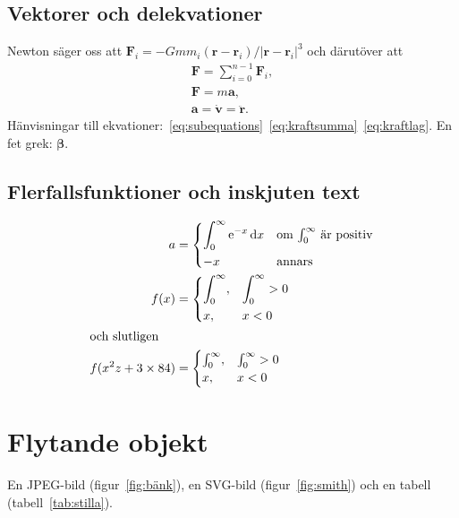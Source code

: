 \documentclass[a4paper, article, oneside, leqno]{memoir}
\begin{document}
\section{Vektorer och delekvationer}
Newton säger oss att \(\mathbf{F}_i = -Gmm_i(\mathbf{r}-\mathbf{r}_i)/|\mathbf{r}-\mathbf{r}_i|^3\) och därutöver att
\begin{subequations}
  \label{eq:subequations}
  \begin{gather}
    \mathbf{F} = \sum_{i=0}^{n-1} \mathbf{F}_i, \label{eq:kraftsumma} \\
    \mathbf{F} = m\mathbf{a} \label{eq:kraftlag}, \\
    \mathbf{a} = \dot{\mathbf{v}} = \ddot{\mathbf{r}}.
  \end{gather}
\end{subequations}
Hänvisningar till ekvationer:~\ref{eq:subequations}~\ref{eq:kraftsumma}~\ref{eq:kraftlag}. En fet grek: \(\boldsymbol{\beta}\).

\section{Flerfallsfunktioner och inskjuten text}

\begin{align}
  a &=
  \begin{dcases*}
    \int_0^\infty \mathrm{e}^{-x}\,\mathrm{d}x & om \(\int_0^\infty\) är positiv\\
    -x & annars
  \end{dcases*} \\
  f(x) &=
  \begin{dcases}
    \int_0^\infty, & \int_0^\infty > 0 \\
    x, & x < 0
  \end{dcases} \\
  \shortintertext{och slutligen}
  f(x^2z+3\times 84) &=
  \begin{cases}
    \int_0^\infty, & \int_0^\infty > 0 \\
    x, & x < 0
  \end{cases}
\end{align}

\chapter{Flytande objekt}

En JPEG-bild (figur~\ref{fig:bänk}), en SVG-bild (figur~\ref{fig:smith}) och en tabell (tabell~\ref{tab:stilla}).
\end{document}
